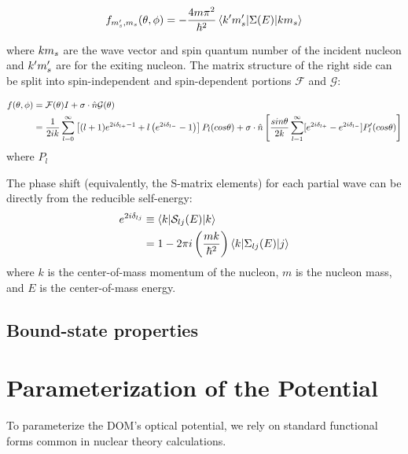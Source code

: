 \begin{equation}
    f_{m'_{s},m_{s}}(\theta,\phi) =
    -\frac{4m\pi^{2}}{\hbar^{2}}\braket{\boldmath{k}'m'_{s}|\Sigma(E)|\boldmath{k}m_{s}}
\end{equation}

\noindent
where $\boldmath{k}m_{s}$ are the wave vector and spin quantum number of the incident nucleon and
$\boldmath{k'}m'_{s}$ are for the exiting nucleon. The matrix structure of the right side can be
split into spin-independent and spin-dependent portions $\mathcal{F}$ and $\mathcal{G}$:

\begin{equation}
    \begin{split}
    f(\theta,\phi) & = \mathcal{F}(\theta)I + \sigma\cdot\boldmath{\hat{n}}\mathcal{G}(\theta)\\
    & = \frac{1}{2ik}\sum_{l=0}^{\infty}\left[(l+1)e^{2i\delta_{l+} - 1} +
    l\left(e^{2i\delta_{l-}}-1\right)\right]P_{l}(cos\theta) +
    \sigma\cdot\boldmath{\hat{n}}\left[\frac{sin\theta}{2k}\sum_{l=1}^{\infty}[e^{2i\delta_{l+}}-e^{2i\delta_{l-}}]P'_{l}(cos\theta)\right]
    \end{split}
\end{equation}
\noindent
where $P_{l}$

The phase shift (equivalently, the S-matrix elements) for each partial wave can be directly from the reducible self-energy:
\begin{equation}
    \begin{split}
        e^{2i\delta_{lj}} & \equiv \braket{k|\mathcal{S}_{lj}(E)|k}\\
        & = 1 - 2\pi i \left(\frac{mk}{\hbar^{2}}\right) \braket{k|\Sigma_{lj}(E)|j}
    \end{split}
\end{equation}
\noindent
where $k$ is the center-of-mass momentum of the nucleon, $m$ is the nucleon mass, and $E$ is the
center-of-mass energy. 
\subsection{Bound-state properties}

\section{Parameterization of the Potential}

To parameterize the DOM's optical potential, we rely on standard functional
forms common in nuclear theory calculations.

